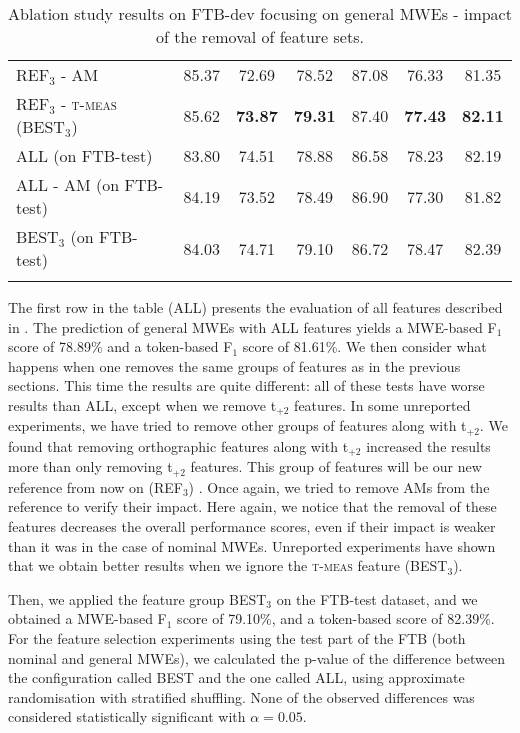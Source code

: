 \documentclass[output=paper,
modfonts
]{langscibook}
\begin{document}
\begin{table*}
\begin{tabular}{l@{~~~}c@{~~~}c@{~~~}c@{~~~~~~~~}c@{~~~}c@{~~~}c}
\textsc{REF$_3$} - \textsc{AM}  & 85.37  & 72.69  & 78.52  & 87.08  & 76.33  & 81.35  \\ %
\textsc{REF$_3$} - \textsc{t-meas} (\textsc{BEST$_3$}) & 85.62 & \textbf{73.87} & \textbf{79.31} & 87.40 & \textbf{77.43} & \textbf{82.11} \\ %
\lspbottomrule
\textsc{ALL} (on FTB-test) & 83.80 & 74.51 & 78.88 & 86.58 & 78.23 & 82.19 \\ 
\textsc{ALL - \textsc{AM}} (on FTB-test) & 84.19 & 73.52 & 78.49 & 86.90 & 77.30 & 81.82 \\ 
\textsc{BEST$_3$} (on FTB-test) & 84.03 & 74.71 & 79.10 & 86.72 & 78.47 & 82.39 \\ 
\lspbottomrule
\end{tabular}
\caption{Ablation study results on FTB-dev focusing on general MWEs - impact of the removal of feature sets.}
\label{tab:ftbAllMWEsCoarse}
\end{table*}

The first row in the table (ALL) presents the evaluation of all features described in . The prediction of general MWEs with ALL features yields a MWE-based F$_1$ score of 78.89\% and a token-based F$_1$ score of 81.61\%.
We then consider what happens when one removes the same groups of features as in the previous sections. This time the results are quite different: all of these tests have worse results than ALL, except when we remove t$_{+2}$ features. In some unreported experiments, we have tried to remove other groups of features along with t$_{+2}$. We found that removing orthographic features along with t$_{+2}$ increased the results more than only removing t$_{+2}$ features. This group of features will be our new reference from now on (REF$_3$)%
. Once again, we tried to remove AMs from the reference to verify their impact. Here again, we notice that the removal of these features decreases the overall performance scores, even if their impact is weaker than it was in the case of nominal MWEs. 
Unreported experiments have shown that we obtain better results when we ignore the \textsc{t-meas} feature (BEST$_3$). 

Then, we applied the feature group BEST$_3$ on the FTB-test dataset, and we obtained a MWE-based F$_1$ score of 79.10\%, and a token-based score of 82.39\%. 
For the feature selection experiments using the test part of the FTB (both nominal and general MWEs), we calculated the p-value of the difference between the configuration called BEST and the one called ALL, using approximate randomisation with stratified shuffling. None of the observed differences was considered statistically significant with $\alpha=0.05$.
\end{document}
